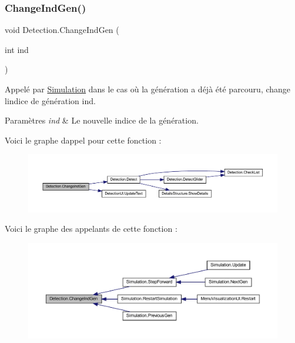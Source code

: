 \subsubsection{\texorpdfstring{Change\+Ind\+Gen()}{ChangeIndGen()}}
{\footnotesize\ttfamily void Detection.\+Change\+Ind\+Gen (\begin{DoxyParamCaption}\item[{int}]{ind }\end{DoxyParamCaption})\hspace{0.3cm}{\ttfamily [inline]}}



Appelé par \mbox{\hyperlink{class_simulation}{Simulation}} dans le cas où la génération a déjà été parcouru, change l\textquotesingle{}indice de génération ind. 


\begin{DoxyParams}{Paramètres}
{\em ind} & Le nouvelle indice de la génération.\\
\hline
\end{DoxyParams}
Voici le graphe d\textquotesingle{}appel pour cette fonction \+:
\nopagebreak
\begin{figure}[H]
\begin{center}
\leavevmode
\includegraphics[width=350pt]{class_detection_a70084049883e8e2ebecce5d24e84a196_cgraph}
\end{center}
\end{figure}
Voici le graphe des appelants de cette fonction \+:
\nopagebreak
\begin{figure}[H]
\begin{center}
\leavevmode
\includegraphics[width=350pt]{class_detection_a70084049883e8e2ebecce5d24e84a196_icgraph}
\end{center}
\end{figure}
\mbox{\label{class_detection_a2d8aeb536aa1051f0522f8317b14b36e}} 
